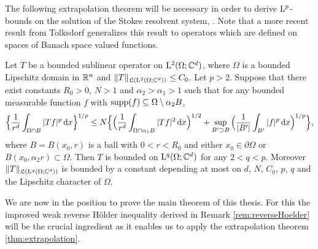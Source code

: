 
The following extrapolation theorem will be necessary in order to derive $\mathrm{L}^p$-bounds on the solution of the Stokes resolvent system, \cite[Thm. 3.3]{shenExtrapolation}.
Note that a more recent result from Tolksdorf \cite{tolksdorfExtra} generalizes this result to operators which are defined on spaces of Banach space valued functions.

\begin{thm}
  \label{thm:extrapolation}
  Let $T$ be a bounded sublinear operator on $\mathrm{L}^2(\Omega; \mathbb{C}^d)$, where $\Omega$ is a bounded Lipschitz domain in $\mathbb{R}^n$ and $\|T\|_{\mathfrak{L}(\mathrm{L}^2(\Omega; \mathbb{C}^d))} \leq C_0$.
  Let $p > 2$.
  Suppose that there exist constants $R_0 > 0$, $N > 1$ and $\alpha_2 > \alpha_1 > 1$ such that for any bounded measurable function $f$ with $\operatorname{supp}(f) \subseteq \Omega \setminus \alpha_2 B$,
  \begin{align*}
    \Big\{ \frac{1}{r^d} \int_{\Omega \cap B} |Tf|^p \, {\operatorname{d}\!{x}} \Big\}^{1/p}
    \leq N \Big\{ \Big( \frac{1}{r^d} \int_{\Omega \cap \alpha_1 B} |T f|^2 \, {\operatorname{d}\!{x}} \Big)^{1/2} + \sup_{B' \supset B} \Big( \frac{1}{|B'|} \int_{B'} |f|^p \, {\operatorname{d}\!{x}} \Big)^{1/p} \Big\},
  \end{align*}
  where $B = B(x_0, r)$ is a ball with $0 < r < R_0$ and either $x_0 \in \partial\Omega$ or $B(x_0, \alpha_2 r) \subset \Omega$.
  Then $T$ is bounded on $\mathrm{L}^q(\Omega; \mathbb{C}^d)$ for any $2 < q < p$.
  Moreover $\|T\|_{\mathfrak{L}(\mathrm{L}^q(\Omega; \mathbb{C}^d))}$ is bounded by a constant depending at most on $d$, $N$, $C_0$, $p$, $q$ and the Lipschitz character of $\Omega$.
\end{thm}

We are now in the position to prove the main theorem of this thesis. For this the improved weak reverse H\"older inequality derived in Remark \ref{rem:reverseHoelder} will be the crucial ingredient as it enables us to apply the extrapolation theorem \ref{thm:extrapolation}.

